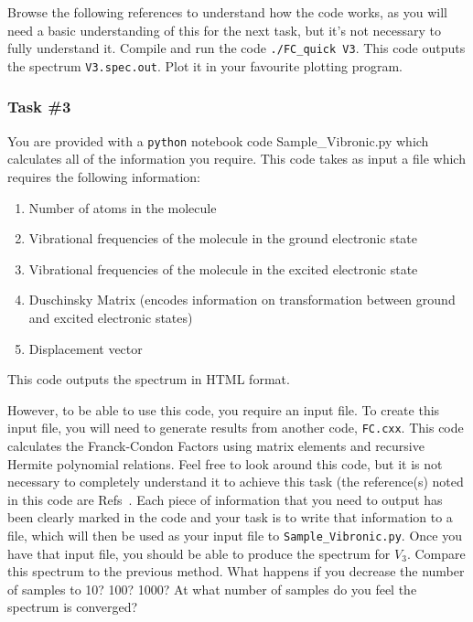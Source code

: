 \documentclass[12pt]{article}
\begin{document}
Browse the following references to understand how the code works, as you will need a basic understanding of this for the next task, but it's not necessary to fully understand it. Compile and run the code \texttt{./FC\_quick V3}. This code outputs the spectrum \texttt{V3.spec.out}. Plot it in your favourite plotting program. 

\subsubsection*{Task \#3}

You are provided with a \texttt{python} notebook code Sample\_Vibronic.py which calculates all of the information you require.
\noindent This code takes as input a file which requires the following information:
\begin{enumerate}
    \item Number of atoms in the molecule
    \item Vibrational frequencies of the molecule in the ground electronic state
    \item Vibrational frequencies of the molecule in the excited electronic state
    \item Duschinsky Matrix (encodes information on transformation between ground and excited electronic states)
    \item Displacement vector
\end{enumerate}

\noindent This code outputs the spectrum in HTML format.

However, to be able to use this code, you require an input file. To create this input file, you will need to generate results from another code, \texttt{FC.cxx}. This code calculates the Franck-Condon Factors using matrix elements and recursive Hermite polynomial relations. Feel free to look around this code, but it is not necessary to completely understand it to achieve this task (the reference(s) noted in this code are Refs~\cite{yang1995structure,doktorov1977dynamical,quesadaFranckCondonFactorsCounting2019}. Each piece of information that you need to output has been clearly marked in the code and your task is to write that information to a file, which will then be used as your input file to \texttt{Sample\_Vibronic.py}. Once you have that input file, you should be able to produce the spectrum for $V_3$. Compare this spectrum to the previous method. What happens if you decrease the number of samples to 10? 100? 1000? At what number of samples do you feel the spectrum is converged?
\end{document}
